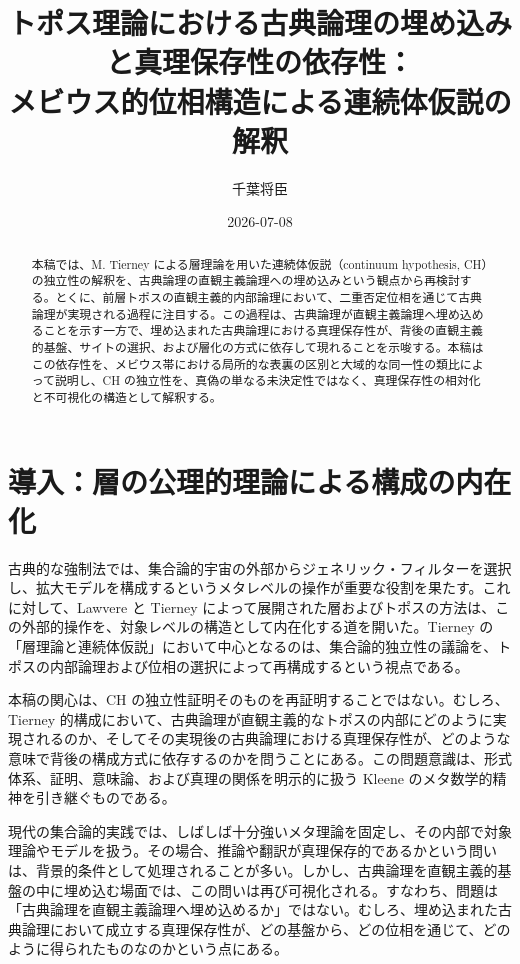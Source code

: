 \documentclass[11pt]{ltjsarticle}
\title{トポス理論における古典論理の埋め込みと真理保存性の依存性：\\
メビウス的位相構造による連続体仮説の解釈}
\author{千葉将臣}
\date{2026-07-08}
\begin{document}
\maketitle

\begin{abstract}
本稿では、M. Tierney による層理論を用いた連続体仮説（continuum hypothesis, CH）の独立性の解釈を、古典論理の直観主義論理への埋め込みという観点から再検討する。とくに、前層トポスの直観主義的内部論理において、二重否定位相を通じて古典論理が実現される過程に注目する。この過程は、古典論理が直観主義論理へ埋め込めることを示す一方で、埋め込まれた古典論理における真理保存性が、背後の直観主義的基盤、サイトの選択、および層化の方式に依存して現れることを示唆する。本稿はこの依存性を、メビウス帯における局所的な表裏の区別と大域的な同一性の類比によって説明し、CH の独立性を、真偽の単なる未決定性ではなく、真理保存性の相対化と不可視化の構造として解釈する。
\end{abstract}

\section{導入：層の公理的理論による構成の内在化}

古典的な強制法では、集合論的宇宙の外部からジェネリック・フィルターを選択し、拡大モデルを構成するというメタレベルの操作が重要な役割を果たす。これに対して、Lawvere と Tierney によって展開された層およびトポスの方法は、この外部的操作を、対象レベルの構造として内在化する道を開いた。Tierney の「層理論と連続体仮説」において中心となるのは、集合論的独立性の議論を、トポスの内部論理および位相の選択によって再構成するという視点である\cite{tierney1972}。

本稿の関心は、CH の独立性証明そのものを再証明することではない。むしろ、Tierney 的構成において、古典論理が直観主義的なトポスの内部にどのように実現されるのか、そしてその実現後の古典論理における真理保存性が、どのような意味で背後の構成方式に依存するのかを問うことにある。この問題意識は、形式体系、証明、意味論、および真理の関係を明示的に扱う Kleene のメタ数学的精神を引き継ぐものである\cite{kleene1952}。

現代の集合論的実践では、しばしば十分強いメタ理論を固定し、その内部で対象理論やモデルを扱う。その場合、推論や翻訳が真理保存的であるかという問いは、背景的条件として処理されることが多い。しかし、古典論理を直観主義的基盤の中に埋め込む場面では、この問いは再び可視化される。すなわち、問題は「古典論理を直観主義論理へ埋め込めるか」ではない。むしろ、埋め込まれた古典論理において成立する真理保存性が、どの基盤から、どの位相を通じて、どのように得られたものなのかという点にある。
\end{document}
